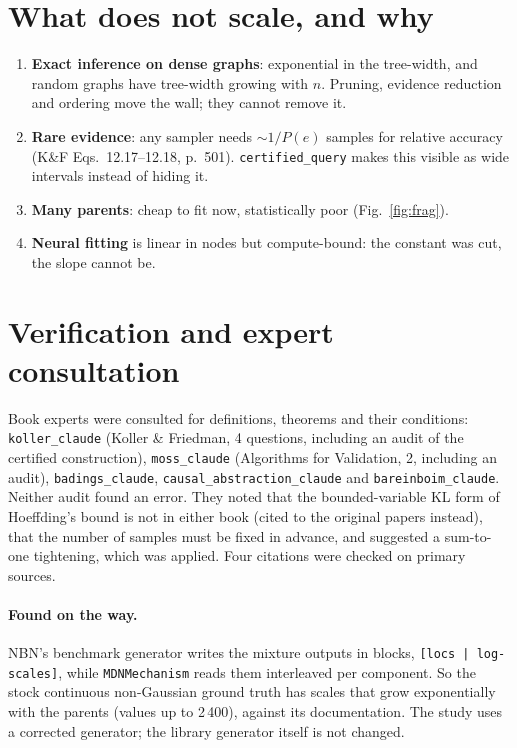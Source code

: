 \documentclass[10pt,a4paper]{article}
\newcommand{\code}[1]{\texttt{#1}}
\begin{document}
\section{What does not scale, and why}
\begin{enumerate}
  \item \textbf{Exact inference on dense graphs}: exponential in the tree-width, and random graphs
  have tree-width growing with $n$. Pruning, evidence reduction and ordering move the wall; they
  cannot remove it.
  \item \textbf{Rare evidence}: any sampler needs $\sim 1/P(e)$ samples for relative accuracy
  (K\&F Eqs.\ 12.17--12.18, p.\ 501). \code{certified\_query} makes this visible as wide
  intervals instead of hiding it.
  \item \textbf{Many parents}: cheap to fit now, statistically poor (Fig.~\ref{fig:frag}).
  \item \textbf{Neural fitting} is linear in nodes but compute-bound: the constant was cut, the
  slope cannot be.
\end{enumerate}

\section{Verification and expert consultation}
Book experts were consulted for definitions, theorems and their conditions: \code{koller\_claude}
(Koller \& Friedman, 4 questions, including an audit of the certified construction),
\code{moss\_claude} (Algorithms for Validation, 2, including an audit),
\code{badings\_claude}, \code{causal\_abstraction\_claude} and \code{bareinboim\_claude}. Neither
audit found an error. They noted that the bounded-variable KL form of Hoeffding's bound is not in
either book (cited to the original papers instead), that the number of samples must be fixed in
advance, and suggested a sum-to-one tightening, which was applied. Four citations were checked on
primary sources.

\paragraph{Found on the way.} NBN's benchmark generator writes the mixture outputs in blocks,
\code{[locs | log-scales]}, while \code{MDNMechanism} reads them interleaved per component. So the
stock continuous non-Gaussian ground truth has scales that grow exponentially with the parents
(values up to 2\,400), against its documentation. The study uses a corrected generator; the
library generator itself is not changed.
\end{document}
